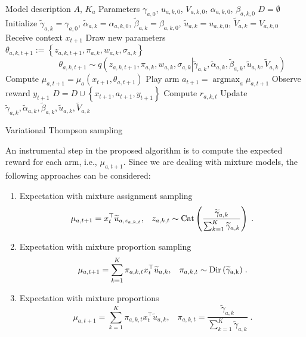 \documentclass{article}
\newcommand{\ie}{i.e., }
\newcommand{\Dir}[1]{{\rm Dir\left( #1\right)}}
\newcommand{\Cat}[1]{{\rm Cat}\left( #1\right)}
\newcommand{\deq}{:=} %
\newcommand{\argmax}{\mathop{\mathrm{argmax}}}
\begin{document}
\begin{algorithm}
	\begin{algorithmic}[1]
	\REQUIRE Model description $A$, $K_a$
	\REQUIRE Parameters $\gamma_{a,0}$, $u_{a,k,0}$, $V_{a,k,0}$, $\alpha_{a,k,0}$, $\beta_{a,k,0}$
	\STATE $D=\emptyset$
	\STATE Initialize $\widetilde{\gamma}_{a,k}=\gamma_{a,0}$, $\widetilde{\alpha}_{a,k}=\alpha_{a,k,0}$, $\widetilde{\beta}_{a,k}=\beta_{a,k,0}$, $ \widetilde{u}_{a,k}=u_{a,k,0}$, $\widetilde{V}_{a,k}=V_{a,k,0}$
		\STATE Receive context $x_{t+1}$
				\STATE Draw new parameters $\theta_{a,k,t+1} \deq \left\{z_{a,k,t+1},\pi_{a,k},w_{a,k},\sigma_{a,k} \right\}$
				$$\qquad \qquad \theta_{a,k,t+1} \sim q\left(z_{a,k,t+1},\pi_{a,k},w_{a,k},\sigma_{a,k} \left| \widetilde{\gamma}_{a,k}, \widetilde{\alpha}_{a,k}, \widetilde{\beta}_{a,k}, \widetilde{u}_{a,k}, \widetilde{V}_{a,k} \right.\right)$$
			\ENDFOR
			\STATE Compute $\mu_{a,t+1}=\mu_{a}(x_{t+1},\theta_{a,t+1})$
		\ENDFOR
		\STATE Play arm $a_{t+1}=\argmax_{a}\mu_{a,t+1}$
		\STATE Observe reward $y_{t+1}$
		\STATE $D=D \cup \left\{x_{t+1}, a_{t+1}, y_{t+1}\right\}$
			\STATE Compute $r_{a,k,t}$
			\STATE Update $\widetilde{\gamma}_{a,k}, \widetilde{\alpha}_{a,k}, \widetilde{\beta}_{a,k}, \widetilde{u}_{a,k}, \widetilde{V}_{a,k}$
		\ENDWHILE
	\ENDFOR
	\end{algorithmic}
	\caption{Variational Thompson sampling}
	\label{alg:vts}
\end{algorithm}

An instrumental step in the proposed algorithm is to compute the expected reward for each arm, \ie $\mu_{a,t+1}$. Since we are dealing with mixture models, the following approaches can be considered:
\begin{enumerate}
	\item Expectation with mixture assignment sampling
	\begin{equation}
	\mu_{a,t+1}=x_{t}^\top \widetilde{u}_{a,z_{a,k,t}}, \; \; \;  z_{a,k,t} \sim \Cat{\frac{\widetilde{\gamma}_{a,k}}{\sum_{k=1}^{K}\widetilde{\gamma}_{a,k}} } \;.
	\end{equation}
	\item Expectation with mixture proportion sampling
	\begin{equation}
	\mu_{a,t+1}=\sum_{k=1}^K \pi_{a,k,t} x_{t}^\top \widetilde{u}_{a,k}, \; \; \; \pi_{a,k,t} \sim \Dir{\widetilde{\gamma}_{a,k} } \;.
	\end{equation}
	\item Expectation with mixture proportions
	\begin{equation}
	\mu_{a,t+1}=\sum_{k=1}^K \pi_{a,k,t} x_{t}^\top \widetilde{u}_{a,k}, \; \; \; \pi_{a,k,t} = \frac{\widetilde{\gamma}_{a,k}}{\sum_{k=1}^{K}\widetilde{\gamma}_{a,k}} \;.
	\end{equation}
\end{enumerate}
\end{document}
